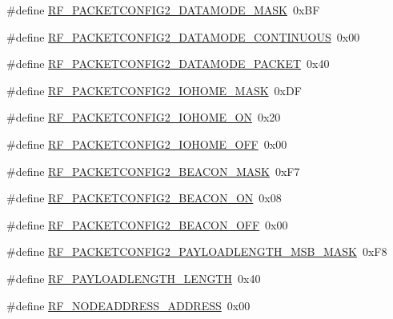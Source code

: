 \begin{DoxyCompactItemize}
\item 
\#define \hyperlink{sx1276Regs-Fsk_8h_abb4848f4bf2f260a572db2e1b7fa8f0b}{R\+F\+\_\+\+P\+A\+C\+K\+E\+T\+C\+O\+N\+F\+I\+G2\+\_\+\+D\+A\+T\+A\+M\+O\+D\+E\+\_\+\+M\+A\+SK}~0x\+BF
\item 
\#define \hyperlink{sx1276Regs-Fsk_8h_a4882838bfea73af51a7e1184a4fd5f6a}{R\+F\+\_\+\+P\+A\+C\+K\+E\+T\+C\+O\+N\+F\+I\+G2\+\_\+\+D\+A\+T\+A\+M\+O\+D\+E\+\_\+\+C\+O\+N\+T\+I\+N\+U\+O\+US}~0x00
\item 
\#define \hyperlink{sx1276Regs-Fsk_8h_a4796ee777b3c32fa2a8ae19b434a1b99}{R\+F\+\_\+\+P\+A\+C\+K\+E\+T\+C\+O\+N\+F\+I\+G2\+\_\+\+D\+A\+T\+A\+M\+O\+D\+E\+\_\+\+P\+A\+C\+K\+ET}~0x40
\item 
\#define \hyperlink{sx1276Regs-Fsk_8h_aec749b50706dc81b547897200273b2a6}{R\+F\+\_\+\+P\+A\+C\+K\+E\+T\+C\+O\+N\+F\+I\+G2\+\_\+\+I\+O\+H\+O\+M\+E\+\_\+\+M\+A\+SK}~0x\+DF
\item 
\#define \hyperlink{sx1276Regs-Fsk_8h_ab3fecfa9a81a7642916f87732b105c60}{R\+F\+\_\+\+P\+A\+C\+K\+E\+T\+C\+O\+N\+F\+I\+G2\+\_\+\+I\+O\+H\+O\+M\+E\+\_\+\+ON}~0x20
\item 
\#define \hyperlink{sx1276Regs-Fsk_8h_a4c835d63f6e0105443e2ce5353f9f7fb}{R\+F\+\_\+\+P\+A\+C\+K\+E\+T\+C\+O\+N\+F\+I\+G2\+\_\+\+I\+O\+H\+O\+M\+E\+\_\+\+O\+FF}~0x00
\item 
\#define \hyperlink{sx1276Regs-Fsk_8h_a1c363971f1c7a8065204bc8c6f156333}{R\+F\+\_\+\+P\+A\+C\+K\+E\+T\+C\+O\+N\+F\+I\+G2\+\_\+\+B\+E\+A\+C\+O\+N\+\_\+\+M\+A\+SK}~0x\+F7
\item 
\#define \hyperlink{sx1276Regs-Fsk_8h_a454732572980957a184bc0ad1b0248e4}{R\+F\+\_\+\+P\+A\+C\+K\+E\+T\+C\+O\+N\+F\+I\+G2\+\_\+\+B\+E\+A\+C\+O\+N\+\_\+\+ON}~0x08
\item 
\#define \hyperlink{sx1276Regs-Fsk_8h_a06a6c1e69dfcb07cc709d00d5935e43d}{R\+F\+\_\+\+P\+A\+C\+K\+E\+T\+C\+O\+N\+F\+I\+G2\+\_\+\+B\+E\+A\+C\+O\+N\+\_\+\+O\+FF}~0x00
\item 
\#define \hyperlink{sx1276Regs-Fsk_8h_a2a5f92482f4317a5eadb24f9ffe5443d}{R\+F\+\_\+\+P\+A\+C\+K\+E\+T\+C\+O\+N\+F\+I\+G2\+\_\+\+P\+A\+Y\+L\+O\+A\+D\+L\+E\+N\+G\+T\+H\+\_\+\+M\+S\+B\+\_\+\+M\+A\+SK}~0x\+F8
\item 
\#define \hyperlink{sx1276Regs-Fsk_8h_a5bedd7662c9e637130ec18bbdc710f3c}{R\+F\+\_\+\+P\+A\+Y\+L\+O\+A\+D\+L\+E\+N\+G\+T\+H\+\_\+\+L\+E\+N\+G\+TH}~0x40
\item 
\#define \hyperlink{sx1276Regs-Fsk_8h_acbca54b084bb21f9cd767b00c83dd4a1}{R\+F\+\_\+\+N\+O\+D\+E\+A\+D\+D\+R\+E\+S\+S\+\_\+\+A\+D\+D\+R\+E\+SS}~0x00

\end{DoxyCompactItemize}
